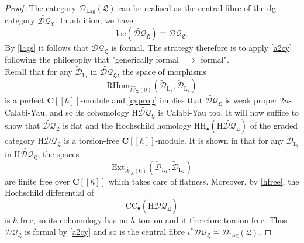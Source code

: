 \documentclass{article}
\theoremstyle{plain}
\theoremstyle{definition}
\theoremstyle{remark}
\newcommand{\mr}{\mathrm}
\newcommand{\C}{\mathbf C}
\newcommand{\brak}{[\![\hbar]\!]}
\newcommand{\3}{\vspace{3mm}}
\newcommand{\2}{\vspace{2mm}}
\newcommand{\1}{\vspace{1mm}}
\begin{document}
\begin{proof}
The category $\mathcal{D}_{\mr{Lag}}(\mathfrak{L})$ can be realised as the central fibre of the dg category $\widetilde{\mathcal{DQ}}_\mathfrak{L}$. In addition, we have $$\mr{loc}\left(\widetilde{\mathcal{DQ}}_\mathfrak{L}\right)\cong\mathcal{DQ}_\mathfrak{L}.$$ By \cref{lags} it follows that $\mathcal{DQ}_\mathfrak{L}$ is formal. The strategy therefore is to apply \cref{a2cy} following the philosophy that "generically formal $\implies$ formal".\\
Recall that for any $\widetilde{\mathscr{D}}_\mr{L_i}$ in $\widetilde{\mathcal{DQ}}_\mathfrak{L}$, the space of morphisms $$\mr{RHom}_{\widehat{\mathscr{W}}_\mr{X}(0)}\left(\widetilde{\mathscr{D}}_\mr{L_1},\widetilde{\mathscr{D}}_\mr{L_2}\right)$$ is a perfect $\C\brak$-module and \cref{cyprop} implies that $\widetilde{\mathcal{DQ}}_\mathfrak{L}$ is weak proper $2n$-Calabi-Yau, and so its cohomology $\mr{H}\widetilde{\mathcal{DQ}}_\mathfrak{L}$ is Calabi-Yau too. It will now suffice to show that $\widetilde{\mathcal{DQ}}_\mathfrak{L}$ is flat and the Hochschild homology $\mr{HH}_\bullet\left(\mr{H}\widetilde{\mathcal{DQ}}_\mathfrak{L}\right)$ of the graded category $\mr{H}\widetilde{\mathcal{DQ}}_\mathfrak{L}$ is a torsion-free $\C\brak$-module. It is shown in \cite{MR4678893} that for any $\widetilde{\mathscr{D}}_\mr{L_i}$ in $\mr{H}\widetilde{\mathcal{DQ}}_\mathfrak{L}$, the spaces $$\mr{Ext}_{\widehat{\mathscr{W}}_\mr{X}(0)}\left(\widetilde{\mathscr{D}}_\mr{L_1},\widetilde{\mathscr{D}}_\mr{L_2}\right)$$ are finite free over $\C\brak$ which takes care of flatness. Moreover, by \cref{hfree}, the Hochschild differential of $$\mr{CC}_\bullet\left(\mr{H}\widetilde{\mathcal{DQ}}_\mathfrak{L}\right)$$ is $\hbar$-free, so its cohomology has no $\hbar$-torsion and it therefore torsion-free. Thus $\widetilde{\mathcal{DQ}}_\mathfrak{L}$ is formal by \cref{a2cy} and so is the central fibre $\iota^*\widetilde{\mathcal{DQ}}_\mathfrak{L}\cong \mathcal{D}_{\mr{Lag}}(\mathfrak{L})$.
\end{proof}
\end{document}
